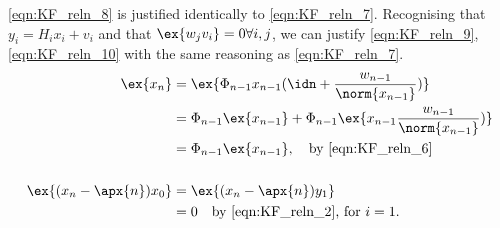 \ref{eqn:KF_reln_8} is justified identically to \ref{eqn:KF_reln_7}. Recognising that $y_i = H_i x_i + v_i$ and that $\ex{w_jv_i} = 0 \forall i,j$, we can justify \ref{eqn:KF_reln_9}, \ref{eqn:KF_reln_10} with the same reasoning as \ref{eqn:KF_reln_7}.
\begin{align}
\ex{x_n} &= \ex{\Phi_{n-1}x_{n-1}(\idn + \frac{w_{n-1}}{\norm{x_{n-1}}})} \\
&= \Phi_{n-1}\ex{x_{n-1}} + \Phi_{n-1}\ex{x_{n-1}\frac{w_{n-1}}{\norm{x_{n-1}}})} \\
&= \Phi_{n-1}\ex{x_{n-1}}, \quad \text{by \ref{eqn:KF_reln_6}} \\
\nonumber \\ 
\ex{(x_n - \apx{n})x_0} &= \ex{(x_n - \apx{n})y_1} \\
&= 0 \quad \text{by \ref{eqn:KF_reln_2}, for $i=1$.}
\end{align}
